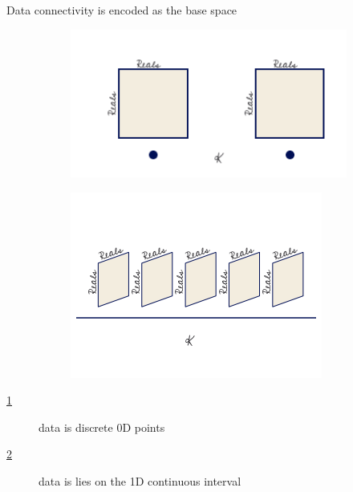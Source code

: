 \documentclass[xcolor={dvipsnames}, handout]{beamer}
\begin{document}
\begin{frame}{Data connectivity is encoded as the base space}
    \begin{figure}[H]
        \begin{subfigure}{.49\textwidth}
            \includegraphics[width=\textwidth]{figures/math/temp_1k.png}
            \caption{}
            \label{fig:base_example_discrete}
        \end{subfigure}
        \begin{subfigure}{.49\textwidth}
            \includegraphics[width=\textwidth]{figures/math/temp_2f.png}
            \caption{}
            \label{fig:base_example_continuous}
        \end{subfigure}
        \caption{}
        \label{fig:base_example}
    \end{figure}
    \begin{description}
        \item[\ref{fig:base_example_discrete}] data is discrete 0D points
        \item[\ref{fig:base_example_continuous}]  data is lies on the 1D continuous interval \dbase\
    \end{description}
\end{frame}
\end{document}
